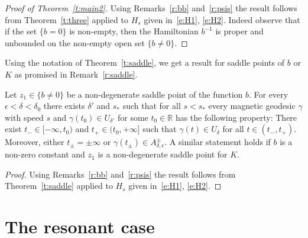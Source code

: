 \documentclass[AHL,Unicode,longabstracts,published]{cedram}
\newcommand{\R}{\mathbb{R}}
\begin{document}
\begin{proof}[Proof of Theorem~\ref{t:main2}]
Using Remarks~\ref{r:bb} and~\ref{r:psis} the result follows from Theorem~\ref{t:three} applied to $H_s$ given in~\eqref{e:H1}, \eqref{e:H2}. Indeed observe that if the set $\{b=0\}$ is non-empty, then the Hamiltonian $b^{-1}$ is proper and unbounded on the non-empty open set $\{b\neq0\}$.
\end{proof}

Using the notation of Theorem~\ref{t:saddle}, we get a result for saddle points of $b$ or $K$ as promised in Remark~\ref{r:saddle}.

\begin{theo}\label{t:saddlemag}
Let $z_1\in\{b\neq0\}$ be a non-degenerate saddle point of the function $b$. For every $\epsilon<\delta<\delta_0$ there exists $\delta'$ and $s_*$ such that for all $s<s_*$ every magnetic geodesic $\gamma$ with speed $s$ and $\gamma(t_0)\in U_{\delta'}$ for some $t_0\in \R$ has the following property: There exist $t_-\in[-\infty,t_0)$ and $t_+\in(t_0,+\infty]$ such that $\gamma(t)\in U_\delta$ for all $t\in(t_-,t_+)$. Moreover, either $t_\pm=\pm\infty$ or $\gamma(t_\pm)\in A^\pm_{\delta,\epsilon}$. A similar statement holds if $b$ is a non-zero constant and $z_1$ is a non-degenerate saddle point for $K$.
\end{theo}


\begin{proof}
Using Remarks~\ref{r:bb} and~\ref{r:psis} the result follows from Theorem~\ref{t:saddle} applied to $H_s$ given in~\eqref{e:H1}, \eqref{e:H2}.
\end{proof}



\section{The resonant case}\label{s:resonant}
\end{document}
